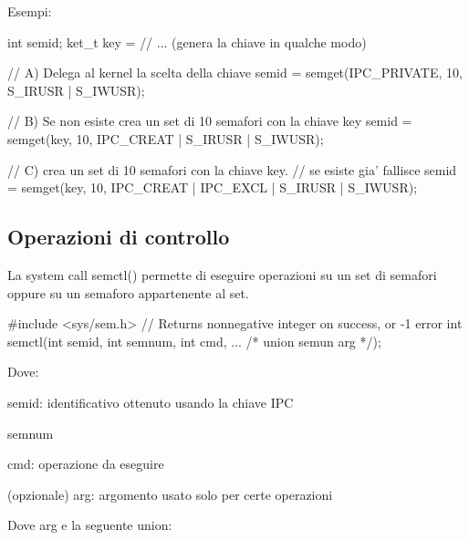Esempi\+: 
\begin{DoxyCode}
\textcolor{keywordtype}{int} semid;
ket\_t key = \textcolor{comment}{// ... (genera la chiave in qualche modo)}

\textcolor{comment}{// A) Delega al kernel la scelta della chiave}
semid = semget(IPC\_PRIVATE, 10, S\_IRUSR | S\_IWUSR);

\textcolor{comment}{// B) Se non esiste crea un set di 10 semafori con la chiave key}
semid = semget(key, 10, IPC\_CREAT | S\_IRUSR | S\_IWUSR);

\textcolor{comment}{// C) crea un set di 10 semafori con la chiave key.}
\textcolor{comment}{//    se esiste gia' fallisce}
semid = semget(key, 10, IPC\_CREAT | IPC\_EXCL | S\_IRUSR | S\_IWUSR);
\end{DoxyCode}


\subsection*{Operazioni di controllo}

La system call {\ttfamily semctl()} permette di eseguire operazioni su un set di semafori oppure su un semaforo appartenente al set.


\begin{DoxyCode}
\textcolor{preprocessor}{#include <sys/sem.h>}
\textcolor{comment}{// Returns nonnegative integer on success, or -1 error}
\textcolor{keywordtype}{int} semctl(\textcolor{keywordtype}{int} semid, \textcolor{keywordtype}{int} semnum, \textcolor{keywordtype}{int} cmd, ... \textcolor{comment}{/* union semun arg */});
\end{DoxyCode}


Dove\+:
\begin{DoxyItemize}
\item {\ttfamily semid}\+: identificativo ottenuto usando la chiave I\+PC
\item {\ttfamily semnum}
\item {\ttfamily cmd}\+: operazione da eseguire
\item (opzionale) {\ttfamily arg}\+: argomento usato solo per certe operazioni
\end{DoxyItemize}

Dove {\ttfamily arg} e\textquotesingle{} la seguente union\+:


